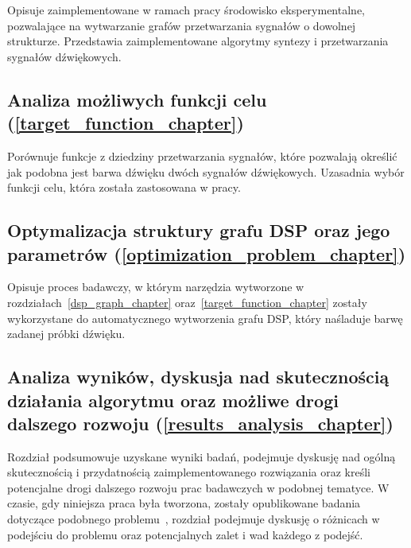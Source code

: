 Opisuje zaimplementowane w ramach pracy środowisko eksperymentalne, pozwalające na wytwarzanie
grafów przetwarzania sygnałów o dowolnej strukturze. Przedstawia zaimplementowane algorytmy syntezy i przetwarzania sygnałów dźwiękowych.

\subsection*{Analiza możliwych funkcji celu (\ref{target_function_chapter}) }

Porównuje funkcje z dziedziny przetwarzania sygnałów, które pozwalają określić jak podobna jest barwa dźwięku dwóch sygnałów dźwiękowych.
Uzasadnia wybór funkcji celu, która została zastosowana w pracy.

\subsection*{Optymalizacja struktury grafu DSP oraz jego parametrów (\ref{optimization_problem_chapter}) }

Opisuje proces badawczy, w którym narzędzia wytworzone w rozdziałach~\ref{dsp_graph_chapter} oraz~\ref{target_function_chapter}
zostały wykorzystane do automatycznego wytworzenia grafu DSP, który naśladuje barwę zadanej próbki dźwięku.

\subsection*{Analiza wyników, dyskusja nad skutecznością działania algorytmu oraz możliwe drogi dalszego rozwoju (\ref{results_analysis_chapter})}

Rozdział podsumowuje uzyskane wyniki badań, podejmuje dyskusję nad ogólną skutecznością i przydatnością zaimplementowanego rozwiązania oraz
kreśli potencjalne drogi dalszego rozwoju prac badawczych w podobnej tematyce. W czasie, gdy niniejsza praca była tworzona, zostały opublikowane badania
dotyczące podobnego problemu~\cite{ieee_synth_programming}, rozdział podejmuje dyskusję o różnicach w podejściu do problemu oraz potencjalnych
zalet i wad każdego z podejść.

